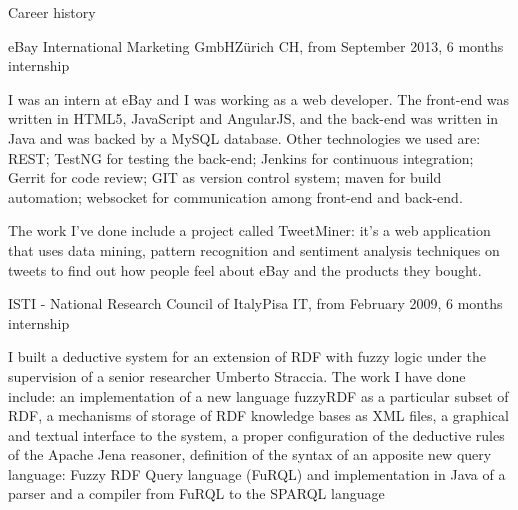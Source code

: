 \documentclass{resume}
\begin{document}
\begin{rSection}{Career history}
        \begin{rSubsection}{eBay International Marketing GmbH}{Z\"urich CH, from September 2013, 6 months internship}{}{}
            \item[]
            I was an intern at eBay and I was working as a web developer. %
            The front-end was written in HTML5, JavaScript and AngularJS, and
            the back-end was written in Java and was backed by a MySQL database.
            Other technologies we used are:
            REST;
            TestNG for testing the back-end;
            Jenkins for continuous integration;
            Gerrit for code review;
            GIT as version control system;
            maven for build automation;
            websocket for communication among front-end and back-end.
            \item[]
            The work I've done include a project called TweetMiner:
            it's a web application that uses data mining, pattern recognition and sentiment analysis techniques on tweets to find out how people feel about eBay and the products they bought.
        \end{rSubsection}

        \begin{rSubsection}{ISTI - National Research Council of Italy}{Pisa IT, from February 2009, 6 months internship}{}{}
            \item[]
            I built a deductive system for an extension of RDF with fuzzy logic under the supervision of a senior researcher Umberto Straccia.
            The work I have done include:
            an implementation of a new language fuzzyRDF as a particular subset of RDF,
            a mechanisms of storage of RDF knowledge bases as XML files,
            a graphical and textual interface to the system,
            a proper configuration of the deductive rules of the Apache Jena reasoner,
            definition of the syntax of an apposite new query language: Fuzzy RDF Query language (FuRQL)
            and implementation in Java of a parser and a compiler from FuRQL to the SPARQL language \\
        \end{rSubsection}
    \end{rSection}
\end{document}
